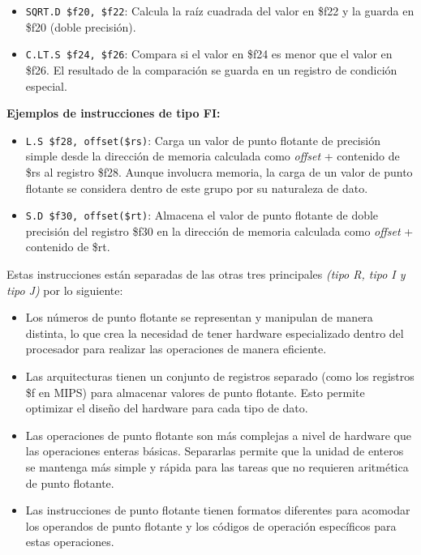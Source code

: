 \documentclass[12pt,letterpaper]{article}
\begin{document}
\begin{enumerate}
\begin{itemize}
  \item \texttt{SQRT.D \$f20, \$f22}:
    Calcula la raíz cuadrada del valor en \$f22 y la guarda en \$f20 (doble precisión).
    
  \item \texttt{C.LT.S \$f24, \$f26}:
    Compara si el valor en \$f24 es menor que el valor en \$f26. El resultado de la comparación se guarda en un registro de condición especial.
  \end{itemize}

  
  \textbf{Ejemplos de instrucciones de tipo FI:}
  \begin{itemize}
  \item \texttt{L.S \$f28, offset(\$rs)}:
    Carga un valor de punto flotante de precisión simple desde la dirección de memoria calculada como \textit{offset} + contenido de \$rs al registro \$f28. Aunque involucra memoria, la carga de un valor de punto flotante se considera dentro de este grupo por su naturaleza de dato.
    
  \item \texttt{S.D \$f30, offset(\$rt)}:
    Almacena el valor de punto flotante de doble precisión del registro \$f30 en la dirección de memoria calculada como \textit{offset} + contenido de \$rt.
  \end{itemize}
  
  Estas instrucciones están separadas de las otras tres principales \textit{(tipo R, tipo I y tipo J)} por lo siguiente:
  
  \begin{itemize}
  \item Los números de punto flotante se representan y manipulan de manera distinta, lo que crea la necesidad de tener hardware especializado dentro del procesador para realizar las operaciones de manera eficiente.
  \item Las arquitecturas tienen un conjunto de registros separado (como los registros \$f en MIPS) para almacenar valores de punto flotante. Esto permite optimizar el diseño del hardware para cada tipo de dato.
  \item Las operaciones de punto flotante son más complejas a nivel de hardware que las operaciones enteras básicas. Separarlas permite que la unidad de enteros se mantenga más simple y rápida para las tareas que no requieren aritmética de punto flotante.
  \item Las instrucciones de punto flotante tienen formatos diferentes para acomodar los operandos de punto flotante y los códigos de operación específicos para estas operaciones.
  \end{itemize}
  \bigskip
  

\end{enumerate}
\end{document}
